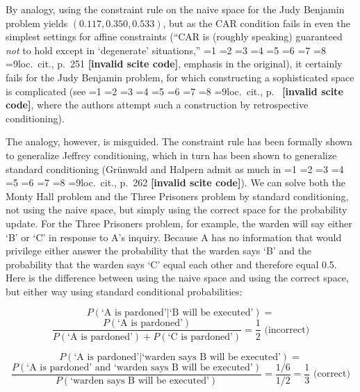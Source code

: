 \documentclass[12pt]{article}
\newcommand{\qnull}[1]{`#1'}
\newcommand{\qeins}[1]{``#1''}
\newcommand{\qzwei}[1]{`#1'}
\newif\ifNumericalOrYear
\newcommand{\PageP}{p.~}
\newcommand{\PageP}{}
\newcommand{\scite}[3]{\ifnum#1=1\ifNumericalOrYear\citep{#2}\else\citeyearpar{#2}\fi\else
\ifnum#1=2\ifNumericalOrYear\citep[#3]{#2}\else\citep[{\PageP}#3]{#2}\fi\else
\ifnum#1=3\ifNumericalOrYear(\citet[#3]{#2})\else\citep[{\PageP}#3]{#2}\fi\else
\ifnum#1=4\ifNumericalOrYear\citet{#2}\else\citet{#2}\fi\else
\ifnum#1=5\ifNumericalOrYear(\citet{#2})\else\citep{#2}\fi\else
\ifnum#1=6\ifNumericalOrYear(\citet[#3]{#2})\else\citep[{\PageP}#3]{#2}\fi\else
\ifnum#1=7\ifNumericalOrYear\citep{#2}\else\citealp{#2}\fi\else
\ifnum#1=8\ifNumericalOrYear\citep[#3]{#2}\else\citealp[{\PageP}#3]{#2}\fi\else
\ifnum#1=9\ifNumericalOrYear\citep[#3]{#2}\else{}loc.\ cit., {\PageP}#3\fi\else
\textbf{[invalid scite code]}\fi\fi\fi\fi\fi\fi\fi\fi\fi}
\begin{document}
By analogy, using the constraint rule on the naive space for the Judy
Benjamin problem yields $(0.117,0.350,0.533)$, but as the CAR
condition fails in even the simplest settings for affine constraints
(\qeins{CAR is (roughly speaking) guaranteed \emph{not} to hold except
  in \qzwei{degenerate} situations,}
\scite{9}{gruenwaldhalpern03}{251}, emphasis in the original), it
certainly fails for the Judy Benjamin problem, for which constructing
a sophisticated space is complicated (see \scite{7}{grovehalpern97}{},
where the authors attempt such a construction by retrospective
conditioning).

The analogy, however, is misguided. The constraint rule has been
formally shown to generalize Jeffrey conditioning, which in turn has
been shown to generalize standard conditioning (Gr{\"u}nwald and
Halpern admit as much in \scite{8}{gruenwaldhalpern03}{262}). We can
solve both the Monty Hall problem and the Three Prisoners problem by
standard conditioning, not using the naive space, but simply using the
correct space for the probability update. For the Three Prisoners
problem, for example, the warden will say either \qnull{B} or
\qnull{C} in response to A's inquiry. Because A has no information
that would privilege either answer the probability that the warden
says \qnull{B} and the probability that the warden says \qnull{C}
equal each other and therefore equal 0.5. Here is the difference
between using the naive space and using the correct space, but either
way using standard conditional probabilities:

\begin{displaymath}
  P(\mbox{`A is pardoned'}|\mbox{`B will be
    executed'})=
\end{displaymath}
\begin{displaymath}
  \frac{P(\mbox{`A is pardoned'})}{P(\mbox{`A is
      pardoned'})+P(\mbox{`C is pardoned'})}=\frac{1}{2}\mbox{ (incorrect)}
\end{displaymath}

\begin{displaymath}
  P(\mbox{`A is pardoned'}|\mbox{`warden says B will be
    executed'})=
\end{displaymath}
\begin{displaymath}
  \frac{P(\mbox{`A is pardoned' and `warden says B will
      be executed'})}{P(\mbox{`warden says B will be
      executed'})}=\frac{1/6}{1/2}=\frac{1}{3}\mbox{ (correct)}
\end{displaymath}
\end{document}
